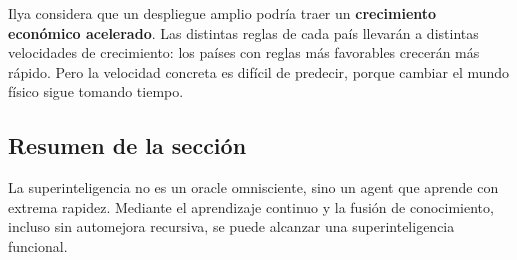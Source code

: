 Ilya considera que un despliegue amplio podría traer un \textbf{crecimiento económico acelerado}. Las distintas reglas de cada país llevarán a distintas velocidades de crecimiento: los países con reglas más favorables crecerán más rápido. Pero la velocidad concreta es difícil de predecir, porque cambiar el mundo físico sigue tomando tiempo.

\subsection{Resumen de la sección}

La superinteligencia no es un oracle omnisciente, sino un agent que aprende con extrema rapidez. Mediante el aprendizaje continuo y la fusión de conocimiento, incluso sin automejora recursiva, se puede alcanzar una superinteligencia funcional.


